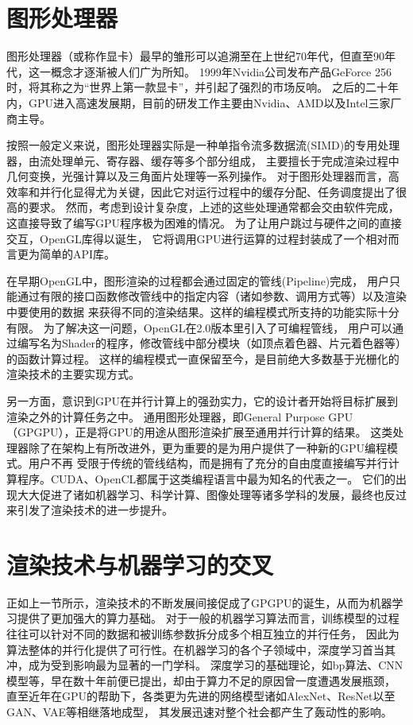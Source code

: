 \section{图形处理器}
图形处理器（或称作显卡）最早的雏形可以追溯至在上世纪70年代，但直至90年代，这一概念才逐渐被人们广为所知。
1999年Nvidia公司发布产品GeForce 256时，将其称之为“世界上第一款显卡”\cite{firstGPU}，并引起了强烈的市场反响。
之后的二十年内，GPU进入高速发展期，目前的研发工作主要由Nvidia、AMD以及Intel三家厂商主导。

按照一般定义来说，图形处理器实际是一种单指令流多数据流(SIMD)的专用处理器，由流处理单元、寄存器、缓存等多个部分组成，
主要擅长于完成渲染过程中几何变换，光强计算以及三角面片处理等一系列操作。
对于图形处理器而言，高效率和并行化显得尤为关键，因此它对运行过程中的缓存分配、任务调度提出了很高的要求。
然而，考虑到设计复杂度，上述的这些处理通常都会交由软件完成，这直接导致了编写GPU程序极为困难的情况。
为了让用户跳过与硬件之间的直接交互，OpenGL库得以诞生，
它将调用GPU进行运算的过程封装成了一个相对而言更为简单的API库。

在早期OpenGL中，图形渲染的过程都会通过固定的管线(Pipeline)完成，
用户只能通过有限的接口函数修改管线中的指定内容（诸如参数、调用方式等）以及渲染中要使用的数据
来获得不同的渲染结果。这样的编程模式所支持的功能实际十分有限。
为了解决这一问题，OpenGL在2.0版本里引入了可编程管线，
用户可以通过编写名为Shader的程序，修改管线中部分模块（如顶点着色器、片元着色器等）的函数计算过程。
这样的编程模式一直保留至今，是目前绝大多数基于光栅化的渲染技术的主要实现方式。

另一方面，意识到GPU在并行计算上的强劲实力，它的设计者开始将目标扩展到渲染之外的计算任务之中。
通用图形处理器，即General Purpose GPU（GPGPU），正是将GPU的用途从图形渲染扩展至通用并行计算的结果。
这类处理器除了在架构上有所改进外，更为重要的是为用户提供了一种新的GPU编程模式。用户不再
受限于传统的管线结构，而是拥有了充分的自由度直接编写并行计算程序。CUDA、OpenCL都属于这类编程语言中最为知名的代表之一。
它们的出现大大促进了诸如机器学习、科学计算、图像处理等诸多学科的发展，最终也反过来引发了渲染技术的进一步提升。

\section{渲染技术与机器学习的交叉}

正如上一节所示，渲染技术的不断发展间接促成了GPGPU的诞生，从而为机器学习提供了更加强大的算力基础。
对于一般的机器学习算法而言，训练模型的过程往往可以针对不同的数据和被训练参数拆分成多个相互独立的并行任务，
因此为算法整体的并行化提供了可行性。在机器学习的各个子领域中，深度学习首当其冲，成为受到影响最为显著的一门学科。
深度学习的基础理论，如bp算法、CNN模型等，早在数十年前便已提出，却由于算力不足的原因曾一度遭遇发展瓶颈，
直至近年在GPU的帮助下，各类更为先进的网络模型诸如AlexNet\cite{Krizhevsky:2012:ICD:2999134.2999257}、ResNet\cite{He2016DeepRL}以至GAN\cite{goodfellow2014generative}、VAE\cite{kingma2013auto}等相继落地成型，
其发展迅速对整个社会都产生了轰动性的影响。

